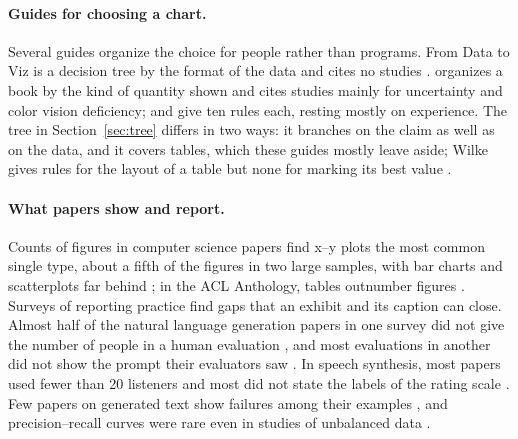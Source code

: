 \documentclass[11pt]{article}
\begin{document}
\paragraph{Guides for choosing a chart.} Several guides organize the choice
for people rather than programs. From Data to Viz is a decision tree by the
format of the data and cites no studies \citep{holtz2018datatoviz}.
\citet{wilke2019fundamentals} organizes a book by the kind of quantity shown
and cites studies mainly for uncertainty and color vision deficiency;
\citet{rougier2014tenrules} and \citet{midway2020principles} give ten rules
each, resting mostly on experience. The tree in Section~\ref{sec:tree} differs
in two ways: it branches on the claim as well as on the data, and it covers
tables, which these guides mostly leave aside; Wilke gives rules for the
layout of a table but none for marking its best value
\citep[Sec.~22.3]{wilke2019fundamentals}.

\paragraph{What papers show and report.} Counts of figures in computer
science papers find x--y plots the most common single type, about a fifth of
the figures in two large samples, with bar charts and scatterplots far behind
\citep[Table~1]{siegel2016figureseer}\citep[Sec.~3.1]{hsu2021scicap}; in the
ACL Anthology, tables outnumber figures \citep[Sec.~4.2]{karishma2023aclfig}.
Surveys of reporting practice find gaps that an exhibit and its caption can
close. Almost half of the natural language generation papers in one survey
did not give the number of people in a human evaluation
\citep[p.~357]{vanderlee2019best}, and most evaluations in another did not
show the prompt their evaluators saw \citep[Sec.~3.2.2]{howcroft2020twenty}. In
speech synthesis, most papers used fewer than 20 listeners
\citep[Table~1]{wester2015are} and most did not state the labels of the
rating scale \citep[Table~3]{kirkland2023stuck}. Few papers on generated text
show failures among their examples \citep[Table~1]{gehrmann2023repairing}, and
precision--recall curves were rare even in studies of unbalanced data
\citep[Table~4]{saito2015precision}.
\end{document}
